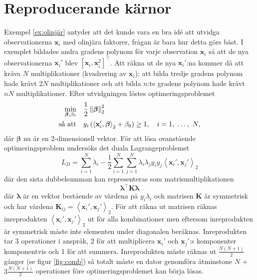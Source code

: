 \documentclass[a4paper, 12pt]{report}
\theoremstyle{definition}
\theoremstyle{remark}
\newcommand{\bfbeta}{{\boldsymbol{\beta}}}
\newcommand{\bfx}{\mathbf{x}}
\newcommand{\llangle}{\left\langle}
\newcommand{\rrangle}{\right\rangle}
\newcommand{\inner}[2]{\llangle #1, #2 \rrangle}
\begin{document}
\chapter{Reproducerande kärnor}
Exempel \ref{ex:olinjär} antyder att det kunde vara en bra idé att utvidga observationerna $\mathbf{x}_i$ med olinjära faktorer, frågan är bara hur detta görs bäst. I exemplet bildades andra gradens polynom för varje observation $\bfx_i$ så att de nya observationerna $\bfx_i'$ blev $\left[\bfx_i, \bfx_i^2\right]^\intercal$. Att räkna ut de nya $\bfx_i'$:na kommer då att kräva $N$ multiplikationer (kvadrering av $\bfx_i$); att bilda tredje gradens polynom hade krävt $2N$ multiplikationer och att bilda $n$:te gradens polynom hade krävt $nN$ multiplikationer. Efter utvidgningen löstes optimeringsproblemet 
\begin{equation*}
\begin{aligned}
\operatornamewithlimits{min}_{\bfbeta, \beta_0} & & &\frac{1}{2}\left\|\bfbeta
\right\|_2^2\\
\text{så att} & & &y_i\left(\inner{\bfx_i'}{\bfbeta}_2+\beta_0\right)\geq 1,\quad i=1,~\dots,~N,
\end{aligned}
\end{equation*}
där $\bfbeta$ nu är en 2-dimensionell vektor. För att lösa ovanstående optimeringsproblem undersöks det duala Lagrangeproblemet
\begin{equation*}
		L_D= \sum_{i=1}^{N}\lambda_i - \frac{1}{2}\sum_{i=1}^{N}\sum_{j=1}^{N}\lambda_i\lambda_jy_iy_j\inner{\bfx_i'}{\bfx_j'}_2
\end{equation*}
där den sista dubbelsumman kan representeras som matrismultiplikationen
\begin{equation*}
	\boldsymbol{\lambda}^\intercal\mathbf{K}\boldsymbol{\lambda}
\end{equation*}
där $\boldsymbol{\lambda}$ är en vektor bestående av värdena på $y_i\lambda_i$ och matrisen $\mathbf{K}$ är symmetrisk och har värdena $\mathbf{K}_{ij}=\inner{\bfx_i'}{\bfx_j'}_2$. För att räkna ut matrisen räknas inreprodukten $\inner{\bfx_i'}{\bfx_j'}_2$ ut för alla kombinationer men eftersom inreprodukten är symmetrisk måste inte elementen under diagonalen beräknas. Inreprodukten tar 3 operationer i anspråk, 2 för att multiplicera $\bfx_i'$ och $\bfx_j'$:s komponenter komponentvis och 1 för att summera. Inreprodukten måste räknas ut $\frac{N(N+1)}{2}$ gånger (se figur \ref{fig:comb}) så totalt måste en dator genomföra åtminstone $N$ + $3\frac{N(N+1)}{2}$ operationer före optimeringsproblemet kan börja lösas.
\end{document}

